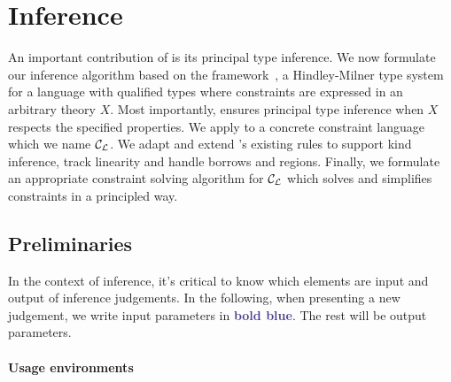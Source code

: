 \section{Inference}
\label{inference}

An important contribution of \affe is its principal type inference.
We now formulate our inference algorithm
based on the \hmx framework~\citep{DBLP:journals/tapos/OderskySW99},
a Hindley-Milner type system for a language
with qualified types where constraints are expressed in an arbitrary
theory $X$.
Most importantly,
\hmx ensures principal type inference
when $X$ respects the specified properties.
We apply \hmx to a concrete constraint language which we name ${\mathcal C_{\mathcal L}}$.
We adapt and extend \hmx's existing rules to support kind inference,
track linearity and handle borrows and regions. Finally, we
formulate an appropriate constraint solving algorithm for ${\mathcal C_{\mathcal L}}$
which solves and simplifies constraints in a principled way.

\subsection{Preliminaries}

In the context of inference, it's critical to know which elements
are input and output of inference judgements.
In the following, when presenting a new judgement,
we write input parameters in \textbf{\textcolor{DarkSlateBlue}{bold blue}}. The rest will be
output parameters.

\paragraph{Usage environments}


